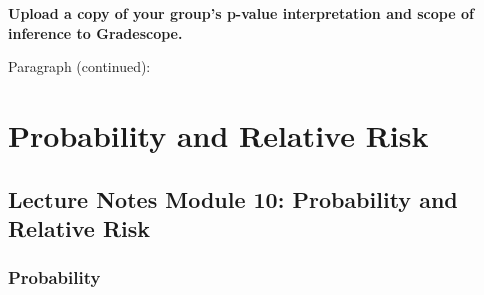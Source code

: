 \documentclass[
]{report}
\begin{document}
\textbf{Upload a copy of your group's p-value interpretation and scope of inference to Gradescope.}

\newpage

Paragraph (continued):

\newpage

\hypertarget{probability-and-relative-risk}{%
\chapter{Probability and Relative Risk}\label{probability-and-relative-risk}}

\hypertarget{lecture-notes-module-10-probability-and-relative-risk}{%
\section{Lecture Notes Module 10: Probability and Relative Risk}\label{lecture-notes-module-10-probability-and-relative-risk}}


\hypertarget{probability}{%
\subsection*{Probability}\label{probability}}

\end{document}
